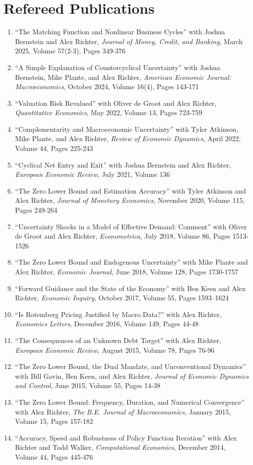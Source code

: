 \documentclass[10pt,letterpaper,en-US]{article}
\begin{document}
\section*{Refereed Publications}
\begin{enumerate}
\item ``The Matching Function and Nonlinear Business Cycles'' with Joshua Bernstein and Alex Richter, \emph{Journal of Money, Credit, and Banking}, March 2025, Volume 57(2-3), Pages 349-376
\item ``A Simple Explanation of Countercyclical Uncertainty'' with Joshua Bernstein, Mike Plante, and Alex Richter, \emph{American Economic Journal: Macroeconomics}, October 2024, Volume 16(4), Pages 143-171
\item ``Valuation Risk Revalued'' with Oliver de Groot and Alex Richter, \emph{Quantitative Economics}, May 2022, Volume 13, Pages 723-759
\item ``Complementarity and Macroeconomic Uncertainty'' with Tyler Atkinson, Mike Plante, and Alex Richter, \emph{Review of Economic Dynamics}, April 2022, Volume 44, Pages 225-243
\item ``Cyclical Net Entry and Exit'' with Joshua Bernstein and Alex Richter, \emph{European Economic Review}, July 2021, Volume 136
\item ``The Zero Lower Bound and Estimation Accuracy'' with Tyler Atkinson and Alex Richter, \emph{Journal of Monetary Economics}, November 2020, Volume 115, Pages 249-264
\item ``Uncertainty Shocks in a Model of Effective Demand: Comment'' with Oliver de Groot and Alex Richter, \emph{Econometrica}, July 2018, Volume 86, Pages 1513-1526
\item ``The Zero Lower Bound and Endogenous Uncertainty'' with Mike Plante and Alex Richter, \emph{Economic Journal}, June 2018, Volume 128, Pages 1730-1757
\item ``Forward Guidance and the State of the Economy'' with Ben Keen and Alex Richter, \emph{Economic Inquiry}, October 2017, Volume 55, Pages 1593–1624
\item ``Is Rotemberg Pricing Justified by Macro Data?'' with Alex Richter, \emph{Economics Letters}, December 2016, Volume 149, Pages 44-48
\item ``The Consequences of an Unknown Debt Target'' with Alex Richter, \emph{European Economic Review}, August 2015, Volume 78, Pages 76-96
\item ``The Zero Lower Bound, the Dual Mandate, and Unconventional Dynamics'' with Bill Gavin, Ben Keen, and Alex Richter, \emph{Journal of Economic Dynamics and Control}, June 2015, Volume 55, Pages 14-38
\item ``The Zero Lower Bound: Frequency, Duration, and Numerical Convergence'' with Alex Richter, \emph{The B.E. Journal of Macroeconomics}, January 2015, Volume 15, Pages 157-182
\item ``Accuracy, Speed and Robustness of Policy Function Iteration'' with Alex Richter and Todd Walker, \emph{Computational Economics}, December 2014, Volume 44, Pages 445-476
\end{enumerate}
\end{document}
